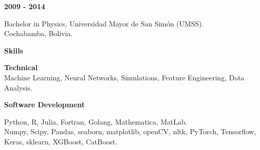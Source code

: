 \documentclass[a4paper,12pt,final]{memoir}
\newcommand{\SmallSep}{\vspace{0.5em}}
\newcommand{\CVSection}[1]
	{\Large\textbf{#1}\par
	\SmallSep\normalsize\normalfont}
\newcommand{\CVItem}[1]
	{\textbf{\color{RoyalBlue} #1}}
\begin{document}
\CVItem{2009 - 2014}\\
\begin{small}
Bachelor in Physics, Universidad Mayor de San Sim\'{o}n (UMSS).\\
Cochabamba, Bolivia.
\end{small}

\SmallSep

\CVSection{Skills}


\CVItem{Technical}\\
{\small Machine Learning, Neural Networks, Simulations, Feature Engineering, Data Analysis.\\}
\vspace{-10pt}
\SmallSep

\CVItem{Software Development}\\
\begin{small}
Python, R, Julia, Fortran, Golang, Mathematica, MatLab.\\
Numpy, Scipy, Pandas, seaborn, matplotlib, openCV, nltk, PyTorch, Tensorflow, Keras, sklearn, XGBoost, CatBoost.\\
\end{small}





\end{document}
